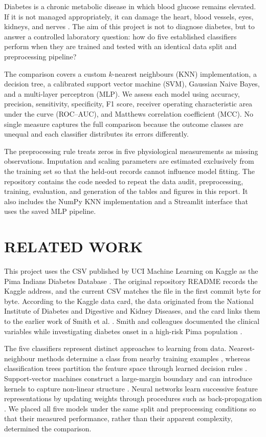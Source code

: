 \documentclass[pdflatex,sn-vancouver-num]{sn-jnl}
\begin{document}
Diabetes is a chronic metabolic disease in which blood glucose remains elevated. If it is not managed appropriately, it can damage the heart, blood vessels, eyes, kidneys, and nerves \cite{who2024diabetes}. The aim of this project is not to diagnose diabetes, but to answer a controlled laboratory question: how do five established classifiers perform when they are trained and tested with an identical data split and preprocessing pipeline?

The comparison covers a custom $k$-nearest neighbours (KNN) implementation, a decision tree, a calibrated support vector machine (SVM), Gaussian Naive Bayes, and a multi-layer perceptron (MLP). We assess each model using accuracy, precision, sensitivity, specificity, F1 score, receiver operating characteristic area under the curve (ROC--AUC), and Matthews correlation coefficient (MCC). No single measure captures the full comparison because the outcome classes are unequal and each classifier distributes its errors differently.

The preprocessing rule treats zeros in five physiological measurements as missing observations. Imputation and scaling parameters are estimated exclusively from the training set so that the held-out records cannot influence model fitting. The repository contains the code needed to repeat the data audit, preprocessing, training, evaluation, and generation of the tables and figures in this report. It also includes the NumPy KNN implementation and a Streamlit interface that uses the saved MLP pipeline.

\section{RELATED WORK}\label{sec:related}

This project uses the CSV published by UCI Machine Learning on Kaggle as the Pima Indians Diabetes Database \cite{uciKagglePima}. The original repository README records the Kaggle address, and the current CSV matches the file in the first commit byte for byte. According to the Kaggle data card, the data originated from the National Institute of Diabetes and Digestive and Kidney Diseases, and the card links them to the earlier work of Smith et al. \cite{uciKagglePima}. Smith and colleagues documented the clinical variables while investigating diabetes onset in a high-risk Pima population \cite{smith1988adap}.

The five classifiers represent distinct approaches to learning from data. Nearest-neighbour methods determine a class from nearby training examples \cite{cover1967nearest}, whereas classification trees partition the feature space through learned decision rules \cite{breiman1984cart}. Support-vector machines construct a large-margin boundary and can introduce kernels to capture non-linear structure \cite{cortes1995svm}. Neural networks learn successive feature representations by updating weights through procedures such as back-propagation \cite{rumelhart1986backprop}. We placed all five models under the same split and preprocessing conditions so that their measured performance, rather than their apparent complexity, determined the comparison.
\end{document}
